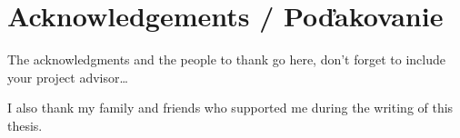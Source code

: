 \thispagestyle{empty}
\section*{Acknowledgements / Poďakovanie}

The acknowledgments and the people to thank go here, don't forget to include your project advisor\ldots

I also thank my family and friends who supported me during the writing of this thesis.


\newpage
\thispagestyle{empty}
\mbox{}
\newpage